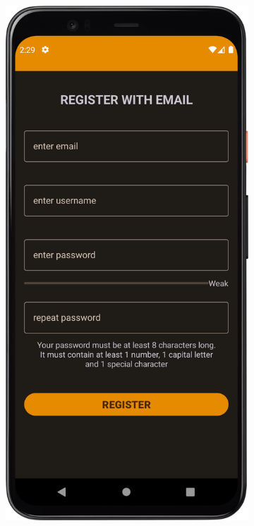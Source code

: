         \begin{figure}[!ht]%
            \centering
            \begin{subfigure}[b]{0.38\textwidth}
                \centering
                \includegraphics[width=\textwidth]{src/app/register1.png}

\end{subfigure}
\end{figure}

